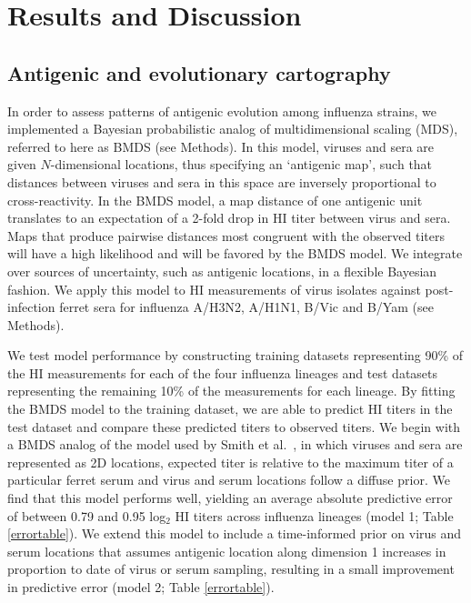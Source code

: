 \documentclass[11pt,oneside,letterpaper]{article}
\begin{document}
\section*{Results and Discussion}

\subsection*{Antigenic and evolutionary cartography}

In order to assess patterns of antigenic evolution among influenza strains, we implemented a Bayesian probabilistic analog of multidimensional scaling (MDS), referred to here as BMDS (see Methods).
In this model, viruses and sera are given $N$-dimensional locations, thus specifying an `antigenic map', such that distances between viruses and sera in this space are inversely proportional to cross-reactivity.
In the BMDS model, a map distance of one antigenic unit translates to an expectation of a 2-fold drop in HI titer between virus and sera.
Maps that produce pairwise distances most congruent with the observed titers will have a high likelihood and will be favored by the BMDS model.
We integrate over sources of uncertainty, such as antigenic locations, in a flexible Bayesian fashion.
We apply this model to HI measurements of virus isolates against post-infection ferret sera for influenza A/H3N2, A/H1N1, B/Vic and B/Yam (see Methods).

We test model performance by constructing training datasets representing 90\% of the HI measurements for each of the four influenza lineages and test datasets representing the remaining 10\% of the measurements for each lineage. 
By fitting the BMDS model to the training dataset, we are able to predict HI titers in the test dataset and compare these predicted titers to observed titers. 
We begin with a BMDS analog of the model used by Smith et al.\ \cite{Smith04}, in which viruses and sera are represented as 2D locations, expected titer is relative to the maximum titer of a particular ferret serum and virus and serum locations follow a diffuse prior.
We find that this model performs well, yielding an average absolute predictive error of between 0.79 and 0.95 log$_2$ HI titers across influenza lineages (model 1; Table \ref{errortable}).
We extend this model to include a time-informed prior on virus and serum locations that assumes antigenic location along dimension 1 increases in proportion to date of virus or serum sampling, resulting in a small improvement in predictive error (model 2; Table \ref{errortable}).
\end{document}
